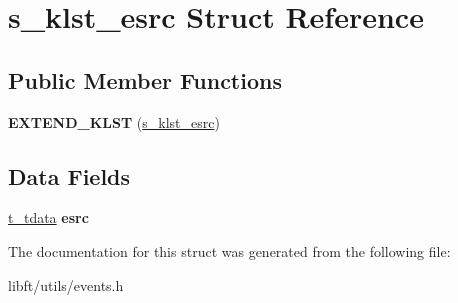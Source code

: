 \hypertarget{structs__klst__esrc}{}\section{s\+\_\+klst\+\_\+esrc Struct Reference}
\label{structs__klst__esrc}
\subsection*{Public Member Functions}
\begin{DoxyCompactItemize}
\item 
\hypertarget{structs__klst__esrc_a56c5d15a066d6e75e6e5864b0348c83d}{}{\bfseries E\+X\+T\+E\+N\+D\+\_\+\+K\+L\+S\+T} (\hyperlink{structs__klst__esrc}{s\+\_\+klst\+\_\+esrc})\label{structs__klst__esrc_a56c5d15a066d6e75e6e5864b0348c83d}

\end{DoxyCompactItemize}
\subsection*{Data Fields}
\begin{DoxyCompactItemize}
\item 
\hypertarget{structs__klst__esrc_a4e861bb11c3a6979e9b79fb14915a965}{}\hyperlink{structs__tdata}{t\+\_\+tdata} {\bfseries esrc}\label{structs__klst__esrc_a4e861bb11c3a6979e9b79fb14915a965}

\end{DoxyCompactItemize}


The documentation for this struct was generated from the following file\+:\begin{DoxyCompactItemize}
\item 
libft/utils/events.\+h\end{DoxyCompactItemize}
